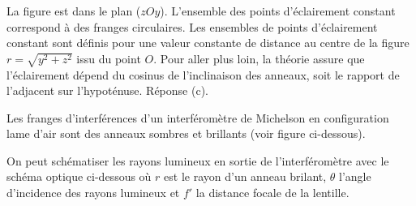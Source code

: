 \reponse{\reponseC{}}

\begin{corrige}
	La figure est dans le plan ($zOy$). L'ensemble des points d'éclairement constant correspond à des franges circulaires. Les ensembles de points d'éclairement constant sont définis pour une valeur constante de distance au centre de la figure $r=\sqrt{y^2+z^2}$ issu du point $O$. Pour aller plus loin, la théorie assure que l'éclairement dépend du cosinus de l'inclinaison des anneaux, soit le rapport de l'adjacent sur l'hypoténuse. Réponse (c).
\end{corrige}


\finEntrainement








\hauteurLargeurCadreReponse		{6mm}{3cm}
\initialisationEntrainement

Les franges d'interférences d'un interféromètre de Michelson en configuration lame d'air sont des anneaux sombres et brillants (voir figure ci-dessous).

On peut schématiser les rayons lumineux en sortie de l'interféromètre avec le schéma optique ci-dessous où $r$ est le rayon d'un anneau brilant, $\theta$ l'angle d'incidence des rayons lumineux et $f'$ la distance focale de la lentille.


                                \initialisationPartieGauche %


